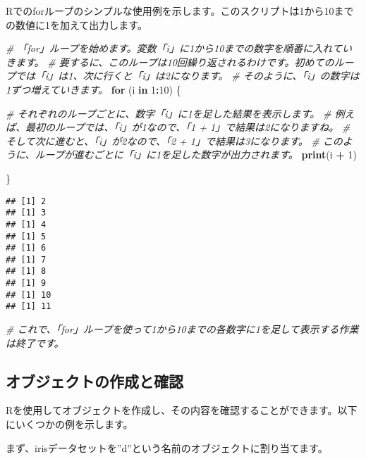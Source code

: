 \documentclass[
]{article}
\newenvironment{Shaded}{\begin{snugshade}}{\end{snugshade}}
\newcommand{\CommentTok}[1]{\textcolor[rgb]{0.56,0.35,0.01}{\textit{#1}}}
\newcommand{\ControlFlowTok}[1]{\textcolor[rgb]{0.13,0.29,0.53}{\textbf{#1}}}
\newcommand{\DecValTok}[1]{\textcolor[rgb]{0.00,0.00,0.81}{#1}}
\newcommand{\FunctionTok}[1]{\textcolor[rgb]{0.13,0.29,0.53}{\textbf{#1}}}
\newcommand{\NormalTok}[1]{#1}
\newcommand{\SpecialCharTok}[1]{\textcolor[rgb]{0.81,0.36,0.00}{\textbf{#1}}}
\begin{document}
Rでのforループのシンプルな使用例を示します。このスクリプトは1から10までの数値に1を加えて出力します。

\begin{Shaded}
\begin{Highlighting}[]
\CommentTok{\# 「for」ループを始めます。変数「i」に1から10までの数字を順番に入れていきます。}
\CommentTok{\# 要するに、このループは10回繰り返されるわけです。初めてのループでは「i」は1、次に行くと「i」は2になります。}
\CommentTok{\# そのように、「i」の数字は1ずつ増えていきます。}
\ControlFlowTok{for}\NormalTok{ (i }\ControlFlowTok{in} \DecValTok{1}\SpecialCharTok{:}\DecValTok{10}\NormalTok{) \{}

  \CommentTok{\# それぞれのループごとに、数字「i」に1を足した結果を表示します。}
  \CommentTok{\# 例えば、最初のループでは、「i」が1なので、「1 + 1」で結果は2になりますね。}
  \CommentTok{\# そして次に進むと、「i」が2なので、「2 + 1」で結果は3になります。}
  \CommentTok{\# このように、ループが進むごとに「i」に1を足した数字が出力されます。}
  \FunctionTok{print}\NormalTok{(i }\SpecialCharTok{+} \DecValTok{1}\NormalTok{)}
  
\NormalTok{\}}
\end{Highlighting}
\end{Shaded}

\begin{verbatim}
## [1] 2
## [1] 3
## [1] 4
## [1] 5
## [1] 6
## [1] 7
## [1] 8
## [1] 9
## [1] 10
## [1] 11
\end{verbatim}

\begin{Shaded}
\begin{Highlighting}[]
\CommentTok{\# これで、「for」ループを使って1から10までの各数字に1を足して表示する作業は終了です。}
\end{Highlighting}
\end{Shaded}

\hypertarget{ux30aaux30d6ux30b8ux30a7ux30afux30c8ux306eux4f5cux6210ux3068ux78baux8a8d}{%
\subsection{オブジェクトの作成と確認}\label{ux30aaux30d6ux30b8ux30a7ux30afux30c8ux306eux4f5cux6210ux3068ux78baux8a8d}}

Rを使用してオブジェクトを作成し、その内容を確認することができます。以下にいくつかの例を示します。

まず、irisデータセットを''d''という名前のオブジェクトに割り当てます。
\end{document}
